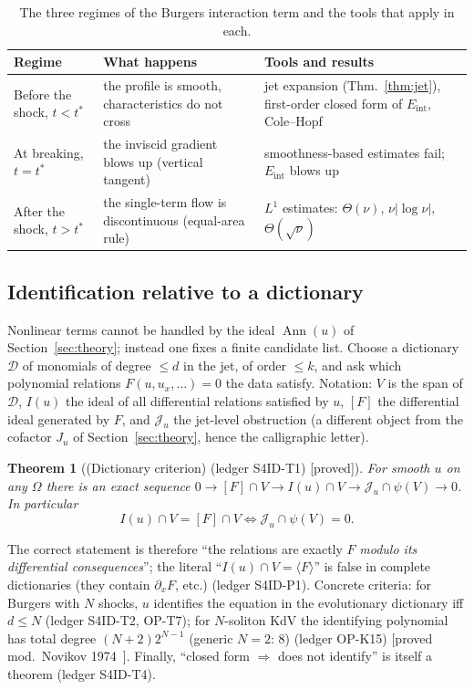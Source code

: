 \documentclass[11pt]{article}
\theoremstyle{plain}
\newtheorem{theorem}{Theorem}[section]
\theoremstyle{definition}
\theoremstyle{remark}
\DeclareMathOperator{\Ann}{Ann}             %
\newcommand{\Eint}{E_{\mathrm{int}}}        %
\newcommand{\badge}[2]{\textcolor{#1}{\textsf{\footnotesize[#2]}}}
\newcommand{\proved}[1][]{\badge{cC}{proved#1}}
\newcommand{\modulo}[1]{\badge{cD}{proved mod.\ #1}}
\newcommand{\led}[1]{\textcolor{cG}{\textsf{\footnotesize(ledger #1)}}}
\newcommand{\edmark}[1]{}
\begin{document}
\begin{table}[!htb]
\centering\small
\begin{tabular}{@{}L{3.0cm}L{4.9cm}L{6.2cm}@{}}
\toprule
Regime & What happens & Tools and results\\\midrule
Before the shock, $t<t^*$ & the profile is smooth, characteristics do not cross & jet expansion (Thm.~\ref{thm:jet}), first-order closed form of $\Eint$, Cole--Hopf\\
At breaking, $t=t^*$ & the inviscid gradient blows up (vertical tangent) & smoothness-based estimates fail; $\Eint$ blows up\\
After the shock, $t>t^*$ & the single-term flow is discontinuous (equal-area rule) & $L^1$ estimates: $\Theta(\nu)$, $\nu|\log\nu|$, $\Theta(\sqrt\nu)$\\
\bottomrule
\end{tabular}
\caption{The three regimes of the Burgers interaction term and the tools that apply in each.}\label{tab:regimes}
\end{table}

\subsection{Identification relative to a dictionary}
Nonlinear terms cannot be handled by the ideal $\Ann(u)$ of Section~\ref{sec:theory}; instead one fixes a finite candidate list. Choose a dictionary $\mathcal D$ of monomials of degree $\le d$ in the jet, of order $\le k$, and ask which polynomial relations $F(u,u_x,\dots)=0$ the data satisfy. Notation: $V$ is the span of $\mathcal D$, $I(u)$ the ideal of all differential relations satisfied by $u$, $[F]$ the differential ideal generated by $F$, and $\mathcal J_u$ the jet-level obstruction (a different object from the cofactor $J_u$ of Section~\ref{sec:theory}, hence the calligraphic letter)\edmark{E13}.
\begin{theorem}[{(Dictionary criterion) \led{S4ID-T1} \proved[]}]\label{thm:dict}
For smooth $u$ on any $\Omega$ there is an exact sequence $0\to[F]\cap V\to I(u)\cap V\to\mathcal J_u\cap\psi(V)\to0$. In particular
\[
I(u)\cap V=[F]\cap V\iff\mathcal J_u\cap\psi(V)=0 .
\]
\end{theorem}
The correct statement is therefore ``the relations are exactly $F$ \emph{modulo its differential consequences}''; the literal ``$I(u)\cap V=\langle F\rangle$'' is false in complete dictionaries (they contain $\partial_xF$, etc.) \led{S4ID-P1}. Concrete criteria: for Burgers with $N$ shocks, $u$ identifies the equation in the evolutionary dictionary iff $d\le N$ \led{S4ID-T2, OP-T7}; for $N$-soliton KdV the identifying polynomial has total degree $(N+2)2^{N-1}$ (generic $N=2$: $8$) \led{OP-K15} \modulo{Novikov 1974~\cite{no}}. Finally, ``closed form $\Rightarrow$ does not identify'' is itself a theorem \led{S4ID-T4}.
\edmark{E2}
\end{document}
